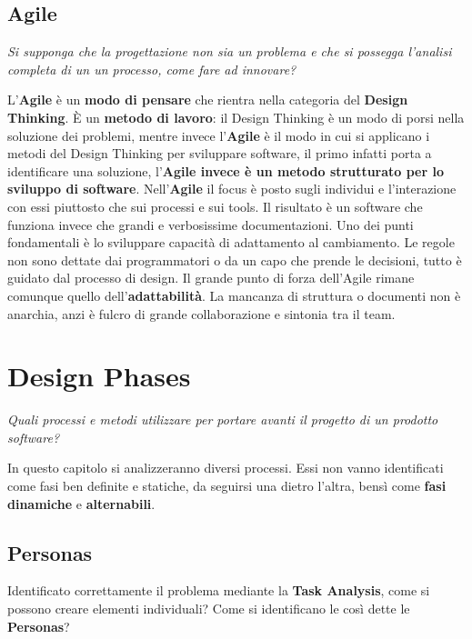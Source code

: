 \documentclass[a4paper,11pt,oneside]{book}
\begin{document}
\section{Agile}
\begin{flushleft}
	\textit{Si supponga che la progettazione non sia un problema e che si possegga l'analisi completa di un un processo, come fare ad innovare?}
\end{flushleft}
L'\textbf{Agile} è un \textbf{modo di pensare} che rientra nella categoria del \textbf{Design Thinking}.
È un \textbf{metodo di lavoro}: il Design Thinking è un modo di porsi nella soluzione dei problemi, mentre invece l'\textbf{Agile} è il modo in cui si applicano i metodi del Design Thinking per sviluppare software, il primo infatti
porta a identificare una soluzione, l'\textbf{Agile invece è un metodo strutturato per lo sviluppo di software}.
Nell'\textbf{Agile} il focus è posto sugli individui e l'interazione con essi piuttosto che sui processi e sui tools. Il risultato è un software che funziona invece che grandi  e verbosissime documentazioni. Uno dei punti fondamentali è lo sviluppare capacità di adattamento al cambiamento.
Le regole non sono dettate dai programmatori o da un capo che prende le decisioni,
tutto è guidato dal processo di design. Il grande punto di forza dell'Agile rimane comunque quello dell'\textbf{adattabilità}. La mancanza di struttura o documenti non è anarchia, anzi è fulcro di grande collaborazione e sintonia tra il team.

\pagebreak

\chapter{Design Phases}
\begin{flushleft}
	\textit{Quali processi e metodi utilizzare per portare avanti il progetto di un
		prodotto software?}
\end{flushleft}

In questo capitolo si analizzeranno diversi processi.
Essi non vanno identificati come fasi ben definite e statiche, da seguirsi una dietro l'altra, bensì come \textbf{fasi} \textbf{dinamiche} e \textbf{alternabili}.

\section{Personas}
Identificato correttamente il problema mediante la \textbf{Task Analysis}, come si  possono creare elementi individuali? Come si identificano le così dette le \textbf{Personas}?
\end{document}
